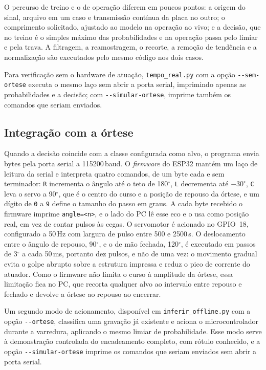 \documentclass[12pt,a4paper]{article}
\begin{document}
O percurso de treino e o de operação diferem em poucos pontos: a origem do sinal, arquivo em um
caso e transmissão contínua da placa no outro; o comprimento solicitado, ajustado ao modelo na
operação ao vivo; e a decisão, que no treino é o simples máximo das probabilidades e na
operação passa pelo limiar e pela trava. A filtragem, a reamostragem, o recorte, a remoção de
tendência e a normalização são executados pelo mesmo código nos dois casos.

Para verificação sem o hardware de atuação, \texttt{tempo\_real.py} com a opção
\texttt{-{}-sem-ortese} executa o mesmo laço sem abrir a porta serial, imprimindo apenas as
probabilidades e a decisão; com \texttt{-{}-simular-ortese}, imprime também os comandos que
seriam enviados.

\subsection{Integração com a órtese}

Quando a decisão coincide com a classe configurada como alvo, o programa envia bytes pela porta
serial a 115200\,baud. O \textit{firmware} do ESP32 mantém um laço de leitura da serial e
interpreta quatro comandos, de um byte cada e sem terminador: \texttt{R} incrementa o ângulo
até o teto de 180$^{\circ}$, \texttt{L} decrementa até $-30^{\circ}$, \texttt{C} leva o servo a
90$^{\circ}$, que é o centro do curso e a posição de repouso da órtese, e um dígito de
\texttt{0} a \texttt{9} define o tamanho do passo em graus. A cada byte recebido o firmware
imprime \texttt{angle=<n>}, e o lado do PC lê esse eco e o usa como posição real, em vez de
contar pulsos às cegas. O servomotor é acionado no GPIO~18, configurado a 50\,Hz com largura de
pulso entre 500 e 2500\,\textmu s. O deslocamento entre o ângulo de repouso, 90$^{\circ}$, e o
de mão fechada, 120$^{\circ}$, é executado em passos de 3$^{\circ}$ a cada 50\,ms, portanto dez
pulsos, e não de uma vez: o movimento gradual evita o golpe abrupto sobre a estrutura impressa
e reduz o pico de corrente do atuador. Como o firmware não limita o curso à amplitude da
órtese, essa limitação fica no PC, que recorta qualquer alvo ao intervalo entre repouso e fechado e
devolve a órtese ao repouso ao encerrar.

Um segundo modo de acionamento, disponível em \texttt{inferir\_offline.py} com a opção
\texttt{-{}-ortese}, classifica uma gravação já existente e aciona o microcontrolador durante a
varredura, aplicando o mesmo limiar de probabilidade. Esse modo serve à demonstração
controlada do encadeamento completo, com rótulo conhecido, e a opção
\texttt{-{}-simular-ortese} imprime os comandos que seriam enviados sem abrir a porta serial.
\end{document}
